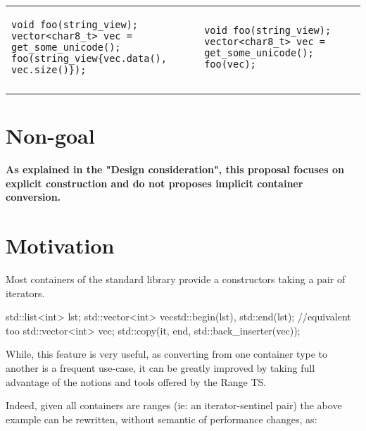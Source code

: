 \documentclass{wg21}
\begin{document}
\begin{center}
\begin{tabular}{l|l}
\begin{minipage}[t]{0.5\textwidth}
\begin{verbatim}
void foo(string_view);
vector<char8_t> vec = get_some_unicode();
foo(string_view{vec.data(), vec.size()});

\end{verbatim}
\end{minipage}
&
\begin{minipage}[t]{0.5\textwidth}
\begin{verbatim}
void foo(string_view);
vector<char8_t> vec = get_some_unicode();
foo(vec);
\end{verbatim}
\end{minipage}
\\\\ \hline



\end{tabular}
\end{center}

\section{Non-goal}

{\bf As explained in the "Design consideration", this proposal focuses on explicit construction and do not proposes implicit container conversion.}

\section{Motivation}

Most containers of the standard library provide a constructors taking a pair of iterators.

\begin{codeblock}
    std::list<int> lst;
    std::vector<int> vec{std::begin(lst), std::end(lst)};
    //equivalent too
    std::vector<int> vec;
    std::copy(it, end, std::back_inserter(vec));
\end{codeblock}

While, this feature is very useful, as converting from one container type to another is a frequent
use-case, it can be greatly improved by taking full advantage of the notions and tools offered by the Range TS.

Indeed, given all containers are ranges (ie: an iterator-sentinel pair) the above example can be rewritten, without semantic of performance changes, as:
\end{document}
